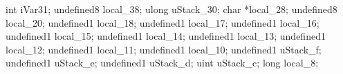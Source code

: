 \documentclass[
]{article}
\newenvironment{Shaded}{}{}
\newcommand{\DataTypeTok}[1]{\textcolor[rgb]{0.56,0.13,0.00}{#1}}
\newcommand{\ExtensionTok}[1]{#1}
\newcommand{\NormalTok}[1]{#1}
\newcommand{\OperatorTok}[1]{\textcolor[rgb]{0.40,0.40,0.40}{#1}}
\begin{document}
\begin{Shaded}
\begin{Highlighting}[]
  \DataTypeTok{int}\NormalTok{ iVar31}\OperatorTok{;}
\NormalTok{  undefined8 local\_38}\OperatorTok{;}
  \ExtensionTok{ulong}\NormalTok{ uStack\_30}\OperatorTok{;}
  \DataTypeTok{char} \OperatorTok{*}\NormalTok{local\_28}\OperatorTok{;}
\NormalTok{  undefined8 local\_20}\OperatorTok{;}
\NormalTok{  undefined1 local\_18}\OperatorTok{;}
\NormalTok{  undefined1 local\_17}\OperatorTok{;}
\NormalTok{  undefined1 local\_16}\OperatorTok{;}
\NormalTok{  undefined1 local\_15}\OperatorTok{;}
\NormalTok{  undefined1 local\_14}\OperatorTok{;}
\NormalTok{  undefined1 local\_13}\OperatorTok{;}
\NormalTok{  undefined1 local\_12}\OperatorTok{;}
\NormalTok{  undefined1 local\_11}\OperatorTok{;}
\NormalTok{  undefined1 local\_10}\OperatorTok{;}
\NormalTok{  undefined1 uStack\_f}\OperatorTok{;}
\NormalTok{  undefined1 uStack\_e}\OperatorTok{;}
\NormalTok{  undefined1 uStack\_d}\OperatorTok{;}
  \ExtensionTok{uint}\NormalTok{ uStack\_c}\OperatorTok{;}
  \DataTypeTok{long}\NormalTok{ local\_8}\OperatorTok{;}
  

\end{Highlighting}
\end{Shaded}
\end{document}
